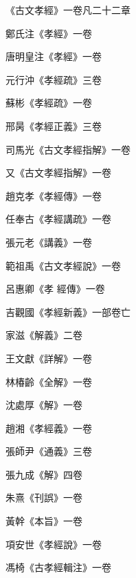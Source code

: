\begin{pinyinscope}
 《古文孝經》一卷凡二十二章



 鄭氏注《孝經》一卷



 唐明皇注《孝經》一卷



 元行沖《孝經疏》三卷



 蘇彬《孝經疏》一卷



 邢昺《孝經正義》三卷



 司馬光《古文孝經指解》一卷



 又《古文孝經指解》一卷



 趙克孝《孝經傳》一卷



 任奉古《孝經講疏》一卷



 張元老《講義》一卷



 範祖禹《古文孝經說》一卷



 呂惠卿《孝
 經傳》一卷



 吉觀國《孝經新義》一部卷亡



 家滋《解義》二卷



 王文獻《詳解》一卷



 林椿齡《全解》一卷



 沈處厚《解》一卷



 趙湘《孝經義》一卷



 張師尹《通義》三卷



 張九成《解》四卷



 朱熹《刊誤》一卷



 黃幹《本旨》一卷



 項安世《孝經說》一卷



 馮椅《古孝經輯注》一卷




\end{pinyinscope}
